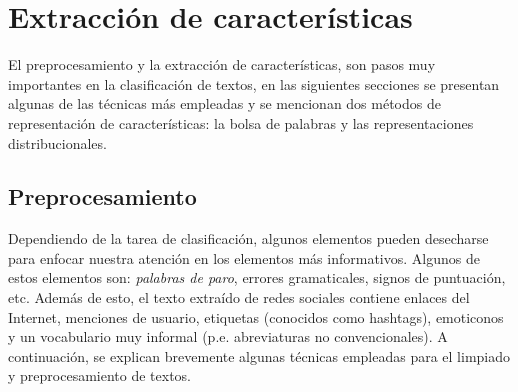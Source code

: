 \section{Extracción de características}
El preprocesamiento y la extracción de características, son pasos muy importantes en la clasificación de textos, en las siguientes secciones se presentan algunas de las técnicas más empleadas y se mencionan dos métodos de representación de características: la bolsa de palabras y las representaciones distribucionales.

\subsection{Preprocesamiento}
Dependiendo de la tarea de clasificación, algunos elementos pueden desecharse para enfocar nuestra atención en los elementos más informativos. Algunos de estos elementos son: \textit{palabras de paro}, errores gramaticales, signos de puntuación, etc. Además de esto, el texto extraído de redes sociales contiene enlaces del Internet, menciones de usuario, etiquetas (conocidos como hashtags), emoticonos y un vocabulario muy informal (p.e. abreviaturas no convencionales). A continuación, se explican brevemente algunas técnicas empleadas para el limpiado y preprocesamiento de textos.

